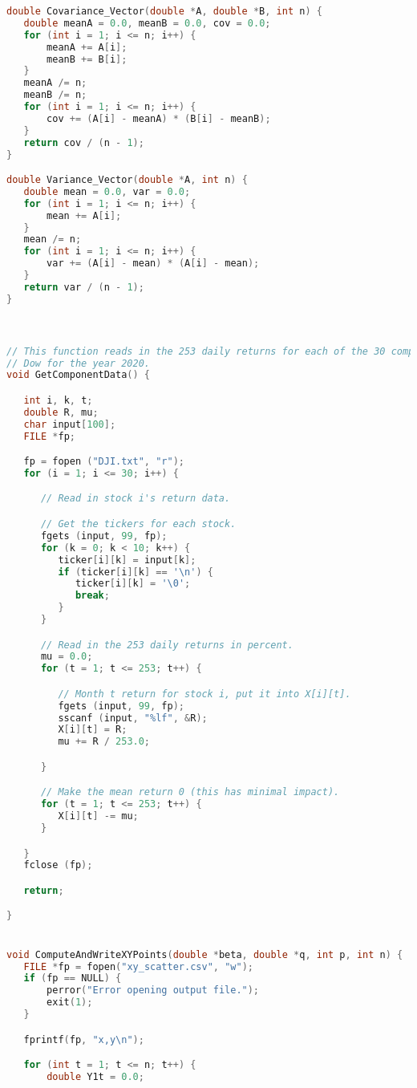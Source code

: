 \documentclass{report}
\begin{document}
\begin{lstlisting}[language=c++]
double Covariance_Vector(double *A, double *B, int n) {
   double meanA = 0.0, meanB = 0.0, cov = 0.0;
   for (int i = 1; i <= n; i++) {
       meanA += A[i];
       meanB += B[i];
   }
   meanA /= n;
   meanB /= n;
   for (int i = 1; i <= n; i++) {
       cov += (A[i] - meanA) * (B[i] - meanB);
   }
   return cov / (n - 1);
}

double Variance_Vector(double *A, int n) {
   double mean = 0.0, var = 0.0;
   for (int i = 1; i <= n; i++) {
       mean += A[i];
   }
   mean /= n;
   for (int i = 1; i <= n; i++) {
       var += (A[i] - mean) * (A[i] - mean);
   }
   return var / (n - 1);
}



// This function reads in the 253 daily returns for each of the 30 components of the
// Dow for the year 2020.
void GetComponentData() {

   int i, k, t;
   double R, mu;
   char input[100];
   FILE *fp;

   fp = fopen ("DJI.txt", "r");
   for (i = 1; i <= 30; i++) {

      // Read in stock i's return data.

      // Get the tickers for each stock.
      fgets (input, 99, fp);
      for (k = 0; k < 10; k++) {
         ticker[i][k] = input[k];
         if (ticker[i][k] == '\n') {
            ticker[i][k] = '\0';
            break;
         }
      }

      // Read in the 253 daily returns in percent.
      mu = 0.0;
      for (t = 1; t <= 253; t++) {

         // Month t return for stock i, put it into X[i][t].
         fgets (input, 99, fp);
         sscanf (input, "%lf", &R);
         X[i][t] = R;
         mu += R / 253.0;

      }

      // Make the mean return 0 (this has minimal impact).
      for (t = 1; t <= 253; t++) {
         X[i][t] -= mu;
      }   

   }
   fclose (fp);

   return;

}


void ComputeAndWriteXYPoints(double *beta, double *q, int p, int n) {
   FILE *fp = fopen("xy_scatter.csv", "w");
   if (fp == NULL) {
       perror("Error opening output file.");
       exit(1);
   }

   fprintf(fp, "x,y\n");

   for (int t = 1; t <= n; t++) {
       double Y1t = 0.0;


\end{lstlisting}
\end{document}
